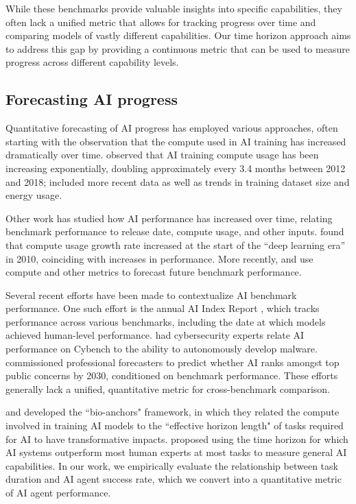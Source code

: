 \documentclass{article}
\begin{document}
While these benchmarks provide valuable insights into specific capabilities, they often lack a unified metric that allows for tracking progress over time and comparing models of vastly different capabilities. Our time horizon approach aims to address this gap by providing a continuous metric that can be used to measure progress across different capability levels.

\subsection{Forecasting AI progress}
Quantitative forecasting of AI progress has employed various approaches, often starting with the observation that the compute used in AI training has increased dramatically over time. \citet{amodei2018ai} observed that AI training compute usage has been increasing exponentially, doubling approximately every 3.4 months between 2012 and 2018; \citet{EpochNotableModels2024} included more recent data as well as trends in training dataset size and energy usage. 

Other work has studied how AI performance has increased over time, relating benchmark performance to release date, compute usage, and other inputs. \citet{sevilla2022compute} found that compute usage growth rate increased at the start of the ``deep learning era'' in 2010, coinciding with increases in performance. More recently, \citet{owen2024predictable} and \citet{pimpale2025forecastingfrontierlanguagemodel} use compute and other metrics to forecast future benchmark performance. 

Several recent efforts have been made to contextualize AI benchmark performance. One such effort is the annual AI Index Report \citep{maslej2024aiindexreport}, which tracks performance across various benchmarks, including the date at which models achieved human-level performance. 
\citet{murray2025mapping} had cybersecurity experts relate AI performance on Cybench \citep{zhang2024cybench} to the ability to autonomously develop malware. \citet{phuong2024evaluating} commissioned professional forecasters to predict whether AI ranks amongst top public concerns by 2030, conditioned on benchmark performance. 
These efforts generally lack a unified, quantitative metric for cross-benchmark comparison.

\citet{carlsmith2020compute} and \citet{cotra2020forecasting} developed the ``bio-anchors" framework, in which they related the compute involved in training AI models to the ``effective horizon length" of tasks required for AI to have transformative impacts. \citet{ngo2023tagi} proposed using the time horizon for which AI systems outperform most human experts at most tasks to measure general AI capabilities. In our work, we empirically evaluate the relationship between task duration and AI agent success rate, which we convert into a quantitative metric of AI agent performance.
\end{document}
